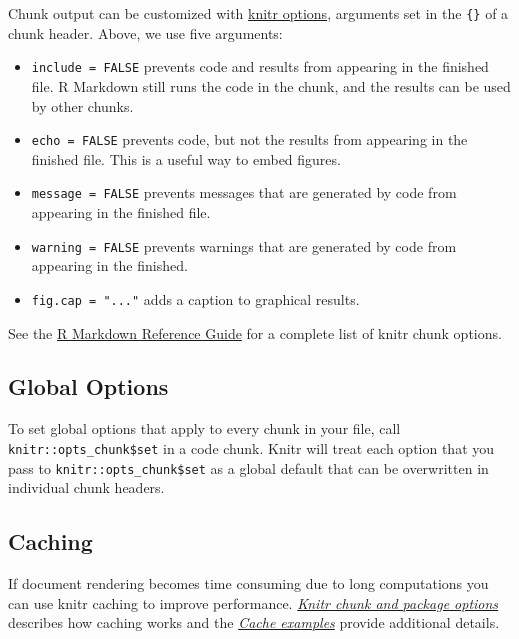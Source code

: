 \documentclass[
]{article}
\begin{document}
Chunk output can be customized with
\href{http://yihui.name/knitr/options/}{knitr options}, arguments set in
the \texttt{\{\}} of a chunk header. Above, we use five arguments:

\begin{itemize}
\item
  \texttt{include\ =\ FALSE} prevents code and results from appearing in
  the finished file. R Markdown still runs the code in the chunk, and
  the results can be used by other chunks.
\item
  \texttt{echo\ =\ FALSE} prevents code, but not the results from
  appearing in the finished file. This is a useful way to embed figures.
\item
  \texttt{message\ =\ FALSE} prevents messages that are generated by
  code from appearing in the finished file.
\item
  \texttt{warning\ =\ FALSE} prevents warnings that are generated by
  code from appearing in the finished.
\item
  \texttt{fig.cap\ =\ "..."} adds a caption to graphical results.
\end{itemize}

See the
\href{https://www.rstudio.com/wp-content/uploads/2015/03/rmarkdown-reference.pdf}{R
Markdown Reference Guide} for a complete list of knitr chunk options.

\subsection{Global Options}\label{global-options}

To set global options that apply to every chunk in your file, call
\texttt{knitr::opts\_chunk\$set} in a code chunk. Knitr will treat each
option that you pass to \texttt{knitr::opts\_chunk\$set} as a global
default that can be overwritten in individual chunk headers.

\subsection{Caching}\label{caching}

If document rendering becomes time consuming due to long computations
you can use knitr caching to improve performance.
\href{http://yihui.name/knitr/options}{\emph{Knitr chunk and package
options}} describes how caching works and the
\href{http://yihui.name/knitr/demo/cache/}{\emph{Cache examples}}
provide additional details.
\end{document}
